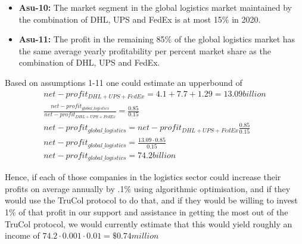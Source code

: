 \begin{itemize}
	\item \textbf{Asu-10:} The market segment in the global logistics market maintained by the combination of DHL, UPS and FedEx is at most 15\% in 2020.
	\item \textbf{Asu-11:} The profit in the remaining 85\% of the global logistics market has the same average yearly profitability per percent market share as the combination of DHL, UPS and FedEx.
\end{itemize}

Based on assumptions 1-11 one could estimate an upperbound of
\begin{equation}
	\begin{split}
		net-profit_{DHL+UPS+FedEx}=4.1+7.7+1.29=13.09 billion\\
		\frac{net-profit_{global\_logistics}}{net-profit_{DHL+UPS+FedEx}}=\frac{0.85}{0.15}\\
		net-profit_{global\_logistics}=net-profit_{DHL+UPS+FedEx}\frac{0.85}{0.15}\\
		net-profit_{global\_logistics}=\frac{13.09\cdot0.85}{0.15}\\
		net-profit_{global\_logistics}=74.2 billion
	\end{split}
\end{equation}

Hence, if each of those companies in the logistics sector could increase their profits on average annually by .1\% using algorithmic optimisation, and if they would use the TruCol protocol to do that, and if they would be willing to invest 1\% of that profit in our support and assistance in getting the most out of the TruCol protocol, we would currently estimate that this would yield roughly an income of $74.2\cdot 0.001\cdot 0.01=\$0.74 million$

